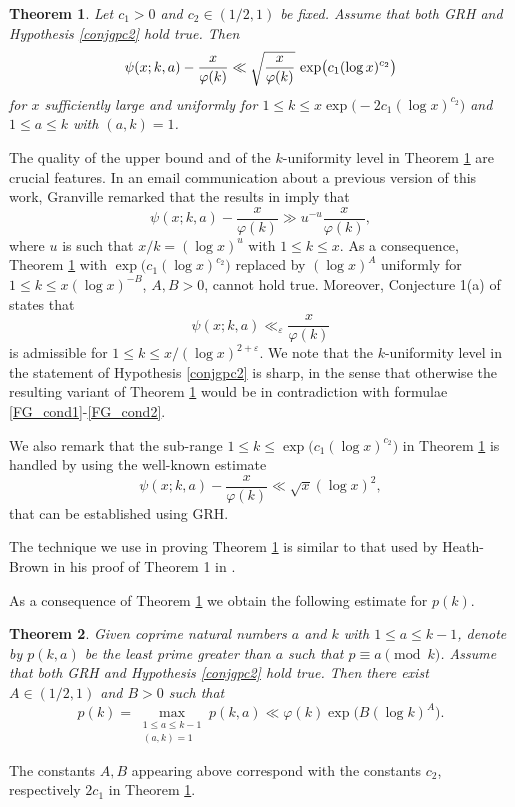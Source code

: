 \documentclass[pdflatex]{sn-jnl}%
\newcommand{\eps}{\ensuremath{\varepsilon}}
\theoremstyle{sltheorems}
\newtheorem{Thm}{Theorem}
\theoremstyle{plainrem}
\theoremstyle{definition}
\begin{document}
\begin{Thm}\label{mor5} 
Let $c_1>0$ and $c_2\in (1/2,1)$ be fixed.
Assume that both GRH and Hypothesis \ref{conjgpc2} 
hold true.  
Then
\begin{equation}
\notag
 \psi(x;k,a) - \frac{x}{\varphi(k)} \ll \sqrt{\frac{x}{\varphi(k)}}\,\exp\bigl(c_1(\log x)^{c_2}\bigr)
\end{equation}
for $x$ sufficiently large and
uniformly for
$ 1 \le  k \le x \exp\bigl(-2c_1(\log x)^{c_2}\bigr)$ and $1\le a\le k$ with $(a,k)=1$.
\end{Thm}
The quality of the upper bound and of the $k$-uniformity level in Theorem \ref{mor5} 
are crucial features.
In an email communication about a previous version of this work,
Granville remarked that the results in \cite{FriedlanderG1989} imply that
\begin{equation}
\label{FG_cond1}
 \psi(x;k,a) - \frac{x}{\varphi(k)} \gg u^{-u}\frac{x}{\varphi(k)},
\end{equation}
where $u$ is such that $x/k = (\log x)^u$ with $1\le k \le x$. 
As a consequence, 
Theorem \ref{mor5} 
with $\exp\bigl(c_1(\log x)^{c_2}\bigr)$ replaced by
$(\log x)^A$ uniformly for $ 1 \le  k \le x (\log x)^{-B}$, $A,B>0$,
cannot hold true.
Moreover, Conjecture 1(a) of \cite[p.~366]{FriedlanderG1989} states that 
\begin{equation}
\label{FG_cond2}
 \psi(x;k,a) \ll_\eps \frac{x}{\varphi(k)} 
\end{equation}
is admissible for  $1\le k \le x/(\log x)^{2+\eps}$. 
We note that the $k$-uniformity level 
in the statement of Hypothesis \ref{conjgpc2} is sharp, in the sense that otherwise the resulting variant
of Theorem \ref{mor5} would be in contradiction with formulae 
\eqref{FG_cond1}-\eqref{FG_cond2}.

We also remark that the sub-range $1\le k \le \exp\bigl(c_1(\log x)^{c_2}\bigr)$ in Theorem \ref{mor5}
is handled by using the well-known estimate
\begin{equation}
\label{GRH-only}
\psi(x;k,a)- \frac{x}{\varphi(k)}
\ll \sqrt{x} (\log x)^2,
\end{equation}
that can be established using GRH.

The technique we use in proving Theorem \ref{mor5} 
is similar to that used by Heath-Brown in his proof of Theorem 1 in \cite{HB1982}.

As a consequence of Theorem \ref{mor5} we obtain the following estimate for $p(k)$.
\begin{Thm}
\label{least-prime-gpc}
Given coprime natural numbers $a$ and $k$ with $1\le a\le k-1$, denote by
$p(k, a)$ be the least prime  
greater than $a$ such that $p \equiv a \pmod{k}$.
Assume that both GRH and Hypothesis \ref{conjgpc2}
hold true.  Then 
there exist $A\in (1/2,1)$ and $B>0$ such that
\[
p(k)=\max_{\substack{1\le a \le k-1 \\ (a,k)= 1}} p(k,a)\ll \varphi(k)\exp\bigl(B(\log k)^{A}\bigr).
\]
\end{Thm}
The constants $A,B$ appearing above correspond with the constants $c_2$, respectively $2c_1$
in Theorem \ref{mor5}.
 
\end{document}
